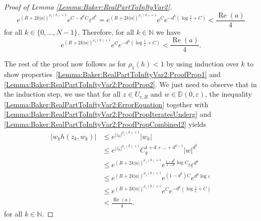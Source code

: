 \documentclass[10pt,a4paper]{amsart}
\newcommand{\D}{{\mathbb D}}
\renewcommand{\Re}{\operatorname{Re}}
\begin{document}
\begin{proof}[Proof of Lemma {\ref{Lemma:Baker:RealPartToInftyVar2}}]
	\begin{equation*}\label{Lemma:Baker:RealPartToInftyVar2:ProofPropEps2}
		e^{(R + 2k \lvert a \rvert)^{\rho_1(h) + 1}} e^{C - d^k C}\varepsilon^{d^k} =  e^{(R + 2k \lvert a \rvert)^{\rho_1(h) + 1}} e^{C}e^{-d^k (\log \frac{1}{\varepsilon} + C)} < \frac{\Re(a)}{4}
	\end{equation*}
	for all $k \in \lbrace 0, \dots, N-1 \rbrace$. 
	Therefore, for all $k \in \mathbb{N}$ we have
	\begin{equation}\label{Lemma:Baker:RealPartToInftyVar2:ProofPropCombined2}
		e^{(R + 2k \lvert a \rvert)^{\rho_1(h) + 1}} e^{C}e^{-d^k (\log \frac{1}{\varepsilon} + C)} < \frac{\Re(a)}{4}.
	\end{equation}
	
	The rest of the proof now follows as for $\rho_1(h) < 1$ by using induction over $k$ to show properties~\eqref{Lemma:Baker:RealPartToInftyVar2:ProofProp1} and \eqref{Lemma:Baker:RealPartToInftyVar2:ProofProp2}. We just need to observe that in the induction step, we use that for all $z \in U_{r,R}$ and $ w \in \D(0,\varepsilon)$, the inequality \eqref{Lemma:Baker:RealPartToInftyVar2:ErrorEquation} together with \eqref{Lemma:Baker:RealPartToInftyVar2:ProofPropIteratesUnderg} and \eqref{Lemma:Baker:RealPartToInftyVar2:ProofPropCombined2} yields
	\begin{equation*}
		\begin{split}
			\lvert w_k h(z_k, w_k) \rvert &\leq e^{\lvert z_k \rvert^{\rho_1(h) + 1}}  \lvert w_k \rvert \\
			&\leq e^{\lvert z_k \rvert^{\rho_1(h) + 1}}  C_g^{1 + d + \dots + d^{k-1}} \lvert w \rvert^{d^k}\\
            &\leq e^{(R + 2k \lvert a \rvert)^{\rho_1(h) + 1}} e^{\frac{1 - d^k}{1 - d} \log C_g} \varepsilon^{d^k} \\
            &\leq e^{(R + 2k \lvert a \rvert)^{\rho_1(h) + 1}} e^{(1 - d^k) C} e^{d^k \log \varepsilon} \\
			&\leq e^{(R + 2k \lvert a \rvert)^{\rho_1(h) + 1}} e^{C}e^{-d^k (\log \frac{1}{\varepsilon} + C)} \\
			&< \frac{\Re(a)}{4}.
		\end{split}
	\end{equation*}
	for all $k\in\mathbb{N}$.
\end{proof}
\end{document}
